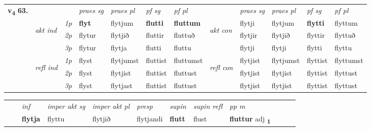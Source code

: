 \begin{tabular}{llllllllllll} \toprule
\multirow{4}{*}{{{\textbf{v{\textsubscript{4}}} \Large{\textbf{63.}}}}}  & &   &  \textit{praes sg}  & \textit{praes pl}  &\textit{ pf sg} & \textit{pf pl} &  &  \textit{praes sg}  & \textit{praes pl}  & \textit{pf sg} & \textit{pf pl } \\*
	\cmidrule{4-7} \cmidrule{9-12}
 & \multirow{3}{*}{\begin{turn}{90}\textit{akt ind}\end{turn}} & {\textit{1p}} & \textbf{flyt} & flytjum    & \textbf{flutti} & \textbf{fluttum} & \multirow{3}{*}{\begin{turn}{90}\textit{akt con}\end{turn}} &flytji & flytjum & \textbf{flytti} & flyttum\\*
& &  {\textit{2p}} &  flytur  & flytjið   & fluttir & fluttuð & & flytjir & flytjið & flyttir & flyttuð \\*
& &  {\textit{3p}} & flytur & flytja   & flutti & fluttu & & flytji & flytji& flytti & flyttu  \\*
\cmidrule{4-7} \cmidrule{9-12}
 &\multirow{3}{*}{\begin{turn}{90}\textit{refl ind}\end{turn}} & {\textit{1p}} & flyst & flytjumst    & fluttist & fluttumst & \multirow{3}{*}{\begin{turn}{90}\textit{refl con}\end{turn}}  &flytjist & flytjumst & flyttist & flyttumst\\*
 &&  {\textit{2p}} &  flyst  & flytjist   & fluttist & fluttust & &flytjist & flytjist & flyttist & flyttust \\*
& &  {\textit{3p}} & flyst & flytjast   & fluttist & fluttust & & flytjist & flytjist& flyttist & flyttust  \\*
\cmidrule{4-7} \cmidrule{9-12}
\end{tabular}


\begin{tabular}{llllllllllll}
 & & \textit{inf} & \textit{imper akt sg} & \textit{imper akt pl}   & \textit{presp} & \textit{supin} & \textit{supin refl} & \textit{pp m}     \\*
  & & \textbf{flytja} & flyttu  & flytjið   & flytjandi &  \textbf{flutt} & flust & \textbf{fluttur} adj \textbf{\textsubscript{1}} \\*
\cmidrule{1-12}
\end{tabular}



